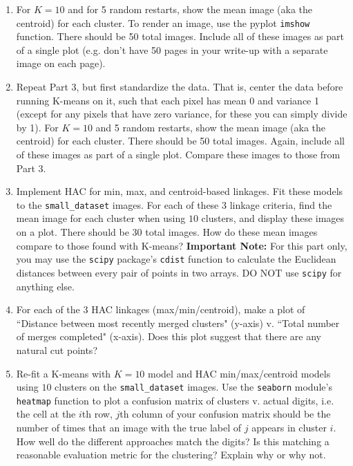 \documentclass[submit]{harvardml}
\begin{document}
\begin{problem}
\begin{enumerate}
\item For $K=10$ and for 5 random restarts, show the mean
  image (aka the centroid) for each cluster.
  To render an image, use the pyplot
  \texttt{imshow} function. There should be 50 total images. Include all of these images
  as part of a single plot (e.g. don't have 50 pages in your write-up with a
  separate image on each page).

\item Repeat Part 3, but first standardize the data. That is, center
  the data before running K-means on it, such that each pixel has mean 0 and variance 1 (except
  for any pixels that have zero variance, for these you can simply
  divide by 1). For $K=10$ and 5 random restarts, show the mean image
  (aka the centroid) for each cluster. There should be 50 total
  images. Again, include all of these images as part of a single plot.
  Compare these images to those from Part 3.

\item Implement HAC for min, max, and centroid-based linkages. Fit these models to the \texttt{small\_dataset} images. 
  For each of these 3 linkage criteria, find the mean image for each cluster when using $10$ clusters, and display these images on a plot. There should be 30 total images.
  How do these mean images compare to those found with K-means? \textbf{Important Note:} For this part only, you may use the \texttt{scipy} package's \texttt{cdist} function to calculate the Euclidean distances between every pair of points in two arrays. DO NOT use \texttt{scipy} for anything else. 

\item For each of the 3 HAC linkages (max/min/centroid), make a plot of
  ``Distance between most recently merged clusters" (y-axis) v. ``Total number of merges completed" (x-axis).
  Does this plot suggest that there are any  natural cut points? 

\item Re-fit a K-means with $K = 10$ model and HAC min/max/centroid models using $10$ clusters on the \texttt{small\_dataset} images. Use the \texttt{seaborn} module's \texttt{heatmap} function to plot a confusion matrix of clusters v. actual digits, i.e. the cell at the $i$th row, $j$th column of your confusion matrix should be the number of times that an image with the true label of $j$ appears in cluster $i$. How well do the different approaches match the digits? Is this matching a reasonable evaluation metric for the clustering?  Explain why or why not.  
  
\end{enumerate}

\end{problem}
\end{document}
